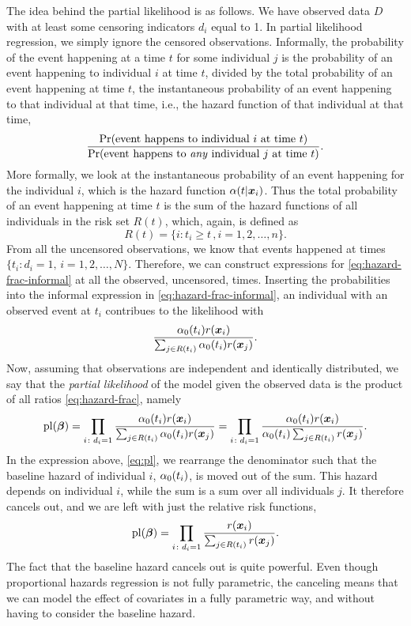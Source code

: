 The idea behind the partial likelihood is as follows.
We have observed data $D$ with at least some censoring indicators $d_i$ equal to 1.
In partial likelihood regression, we simply ignore the censored observations.
Informally, the probability of the event happening at a time $t$ for some individual $j$ is the probability of an event happening to individual $i$ at time $t$, divided by the total probability of an event happening at time $t$, the instantaneous probability of an event happening to that individual at that time, i.e., the hazard function of that individual at that time,
\begin{equation}\label{eq:hazard-frac-informal}
    \frac{\Pr(\text{event happens to individual }i\text{ at time }t)}{\Pr(\text{event happens to \textit{any} individual }j\text{ at time }t)}.
\end{equation}
More formally, we look at the instantaneous probability of an event happening for the individual $i$, which is the hazard function $\alpha(t|\bm{x}_i)$.
Thus the total probability of an event happening at time $t$ is the sum of the hazard functions of all individuals in the risk set
$R(t)$, which, again, is defined as
\begin{equation*}
    R(t)=\{i\colon t_i\geq t\,,i=1,2,\ldots,n\}.
\end{equation*}
From all the uncensored observations, we know that events happened at times $\{t_i\colon d_i=1,\,i=1,2,\ldots,N\}$. Therefore, we can construct expressions for \eqref{eq:hazard-frac-informal} at all the observed, uncensored, times.
Inserting the probabilities into the informal expression in \eqref{eq:hazard-frac-informal}, an individual with an observed event at $t_i$ 
contribues to the likelihood with
\begin{equation}\label{eq:hazard-frac}
    \frac{\alpha_0(t_i)r(\bm{x}_i)}{\sum_{j\in R(t_i)} \alpha_0(t_i)r(\bm{x}_j)}.
\end{equation}
Now, assuming that observations are independent and identically distributed, we say that the \textit{partial likelihood} of the model
given the observed data is the product of all ratios \eqref{eq:hazard-frac}, namely
\begin{equation}\label{eq:pl}
    \operatorname{pl}(\boldsymbol{\beta})=\prod_{i\colon d_i=1}\frac{\alpha_0(t_i)r(\bm{x}_i)}{\sum_{j\in R(t_i)} \alpha_0(t_i)r(\bm{x}_j)}=\prod_{i\colon d_i=1}\frac{\alpha_0(t_i)r(\bm{x}_i)}{\alpha_0(t_i)\sum_{j\in R(t_i)}r(\bm{x}_j)}.
\end{equation}
In the expression above, \eqref{eq:pl}, we rearrange the denominator such that the baseline hazard of individual $i$, $\alpha_0(t_i)$, is moved out of the sum.
This hazard depends on individual $i$, while the sum is a sum over all individuals $j$.
It therefore cancels out, and we are left with just the relative risk functions,
\begin{equation*}
    \operatorname{pl}(\boldsymbol{\beta})=\prod_{i\colon d_i=1}\frac{r(\bm{x}_i)}{\sum_{j\in R(t_i)}r(\bm{x}_j)}.
\end{equation*}
The fact that the baseline hazard cancels out is quite powerful.
Even though proportional hazards regression is not fully parametric,
the canceling means that we can model the effect of covariates in a fully parametric way, and without having to consider the baseline hazard.

